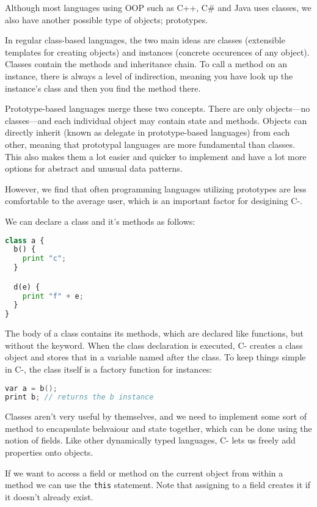 Although most languages using \ac{OOP} such as C++, C\# and Java uses classes, we also have another possible type of objects; prototypes.

In regular class-based languages, the two main ideas are classes (extensible templates for creating objects) and instances (concrete occurences of any object). Classes contain the methods and inheritance chain. To call a method on an instance, there is always a level of indirection, meaning you have look up the instance’s class and then you find the method there.

Prototype-based languages merge these two concepts. There are only objects—no classes—and each individual object may contain state and methods. Objects can directly inherit (known as delegate in prototype-based languages) from each other, meaning that prototypal languages are more fundamental than classes. This also makes them a lot easier and quicker to implement and have a lot more options for abstract and unusual data patterns. 

However, we find that often programming languages utilizing prototypes are less comfortable to the average user, which is an important factor for desigining C-.

We can declare a class and it's methods as follows:

\begin{lstlisting}[language=python]
class a {
  b() {
    print "c";
  }

  d(e) {
    print "f" + e;
  }
}
\end{lstlisting}

The body of a class contains its methods, which are declared like functions, but without the keyword. When the class declaration is executed, C- creates a class object and stores that in a variable named after the class. To keep things simple in C-, the class itself is a factory function for instances: 

\begin{lstlisting}[language=C++]
var a = b();
print b; // returns the b instance
\end{lstlisting}

Classes aren't very useful by themselves, and we need to implement some sort of method to encapsulate behvaiour and state together, which can be done using the notion of fields. Like other dynamically typed languages, C- lets us freely add properties onto objects. 

If we want to access a field or method on the current object from within a method we can use the \verb+this+ statement. Note that assigning to a field creates it if it doesn't already exist.

